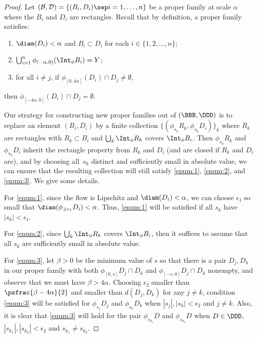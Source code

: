 \begin{proof}
Let $(\mathcal{B},\mathcal{D})= \{(B_i, D_i) \sep i = 1, \ldots, n \}$ be a proper family at scale $\alpha$ where the $B_i$ and $D_i$ are rectangles. Recall that by definition, a proper family satisfies:
\begin{enumerate}
\item\label{enum:1}
$\diam (D_i)< \alpha$ and $B_i \subset D_i$ for each $i \in \{1, 2, \ldots, n\}$;
\item\label{enum:2}
$\bigcup_{i=1}^n\phi_{(-\alpha, 0)} (\Int_\phi B_i)=Y$;
\item\label{enum:3}
for all $i\neq j$, if $\phi_{[0, 4\alpha]}(D_i) \cap D_j \neq \emptyset$, 
\end{enumerate}
then $\phi_{[-4\alpha, 0]}(D_i) \cap D_j = \emptyset$.

Our strategy for constructing new proper families out of $(\BBB, \DDD)$ is to replace an element $(B_i, D_i)$ by a finite collection $\{ (\phi_{s_k}R_k, \phi_{s_k}D_i) \}_k$ where $R_k$ are rectangles with $R_k \subset B_i$ and $\bigcup_k \Int_\phi R_k$ covers $\Int_\phi B_i$. Then $\phi_{s_k}R_k$ and $\phi_{s_k}D_i$ inherit the rectangle property from $R_k$ and $D_i$ (and are closed if $R_k$ and $D_i$ are), and by choosing all~$s_k$ distinct and sufficiently small in absolute value, we can ensure that the resulting collection will still satisfy \eqref{enum:1}, \eqref{enum:2}, and \eqref{enum:3}. We give some details.

For \eqref{enum:1}, since the flow is Lipschitz and $\diam(D_{i})<\alpha$, we can choose $\epsilon_1$ so small that $\diam(\phi_{\pm\epsilon_1}D_{i})<\alpha$. Thus, \eqref{enum:1} will be satisfied if all $s_k$ have $|s_k| < \epsilon_1$.

For \eqref{enum:2}, since $\bigcup_k \Int_\phi R_k$ covers $\Int_\phi B_i$, then it suffices to assume that all $s_k$ are sufficiently small in absolute value.

For \eqref{enum:3}, let $\beta>0$ be the minimum value of $s$ so that there is a pair $D_j, D_k$ in our proper family with both $\phi_{[0,s]} D_j \cap D_k$ and $\phi_{[-s,0]} D_j \cap D_k$ nonempty, and observe that we must have $\beta>4\alpha$. Choosing $\epsilon_2$ smaller than $\psfrac{\beta-4\alpha}{2}$ and smaller than $d(D_j, D_k)$ for any $j\neq k$, condition \eqref{enum:3} will be satisfied for $\phi_{s_j} D_j$ and $\phi_{s_k}D_k$ when $|s_j|, |s_k| < \epsilon_2$ and $j\neq k$. Also, it is clear that \eqref{enum:3} will hold for the pair $\phi_{s_{k_1}} D$ and $\phi_{s_{k_2}}D$ when $D \in \DDD$, $|s_{k_1}|, |s_{k_2}| < \epsilon_2$ and $s_{k_1} \neq s_{k_2}$.


\end{proof}
